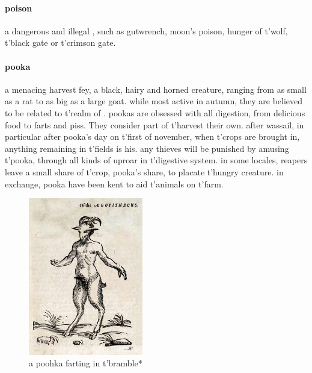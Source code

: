 \paragraph{poison} a dangerous and illegal , such as gutwrench, moon's poison, hunger of t'\allowbreak wolf, t'\allowbreak black gate or t'\allowbreak crimson gate.
\paragraph{pooka} a menacing harvest fey, a black, hairy and horned creature, ranging from as small as a rat to as big as a large goat. while most active in autumn, they are believed to be related to t'\allowbreak realm of . pookas are obsessed with all digestion, from delicious food to farts and piss. They consider part of t'\allowbreak harvest their own. after wassail, in particular after pooka's day on t'\allowbreak first of november, when t'\allowbreak crops are brought in, anything remaining in t'\allowbreak fields is his. any thieves will be punished by amusing t'\allowbreak pooka, through all kinds of uproar in t'\allowbreak digestive system. in some locales, reapers leave a small share of t'\allowbreak crop, pooka's share, to placate t'\allowbreak hungry creature. in exchange, pooka have been kent to aid t'\allowbreak animals on t'\allowbreak farm. \begin{figure}\centering\includegraphics[width=5cm]{encyclopedia/Faun}\caption{a poohka farting in t'\allowbreak bramble*}\end{figure}
